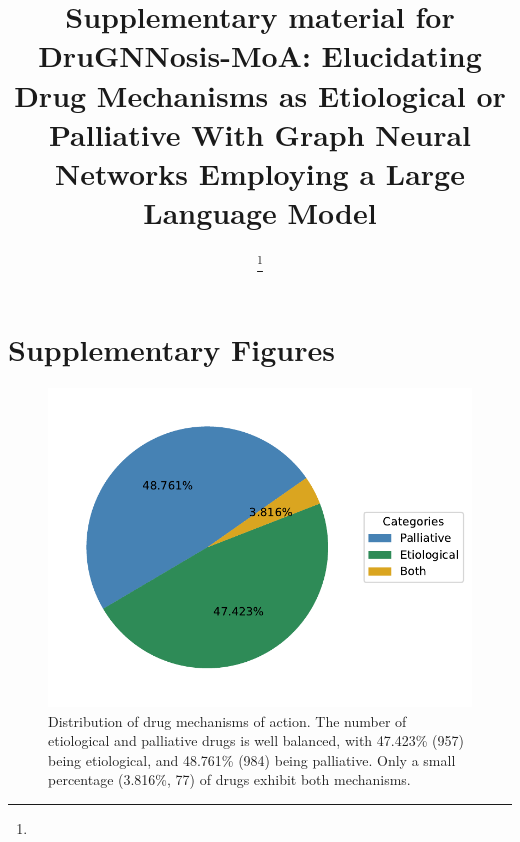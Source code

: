 \documentclass[journal,twoside,web]{ieeecolor}
\begin{document}
\title{Supplementary material for\\ DruGNNosis-MoA: Elucidating Drug Mechanisms as Etiological or Palliative With Graph Neural Networks Employing a Large Language Model}
\author{
\thanks{
}
}

\maketitle






\appendices

\setcounter{figure}{0}
\renewcommand\thefigure{S\arabic{figure}} %

\section{Supplementary Figures}
\begin{figure}[h!]
    \centering
    \includegraphics[width=\linewidth]{Figures/EvsP.pdf}
    \caption{Distribution of drug mechanisms of action. The number of etiological and palliative drugs is well balanced, with 47.423\% (957) being etiological, and 48.761\% (984) being palliative.
    Only a small percentage (3.816\%, 77) of drugs exhibit both mechanisms.}
    \label{fig:EvsP}
\end{figure}
\end{document}
